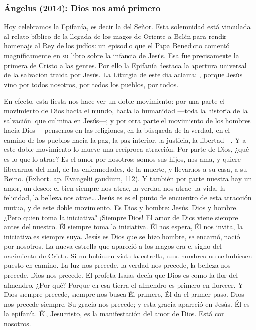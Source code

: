 			
			\subsubsection{Ángelus (2014): Dios nos amó primero}
			
				
				\begin{body}
					Hoy celebramos la Epifanía, es decir la  del Señor. Esta solemnidad está vinculada al relato bíblico de la llegada de los magos de Oriente a Belén para rendir homenaje al Rey de los judíos: un episodio que el Papa Benedicto comentó magníficamente en su libro sobre la infancia de Jesús. Esa fue precisamente la primera  de Cristo a las gentes. Por ello la Epifanía destaca la apertura universal de la salvación traída por Jesús. La Liturgia de este día aclama: , porque Jesús vino por todos nosotros, por todos los pueblos, por todos.
					
					En efecto, esta fiesta nos hace ver un doble movimiento: por una parte el movimiento de Dios hacia el mundo, hacia la humanidad ---toda la historia de la salvación, que culmina en Jesús---; y por otra parte el movimiento de los hombres hacia Dios ---pensemos en las religiones, en la búsqueda de la verdad, en el camino de los pueblos hacia la paz, la paz interior, la justicia, la libertad---. Y a este doble movimiento lo mueve una recíproca atracción. Por parte de Dios, ¿qué es lo que lo atrae? Es el amor por nosotros: somos sus hijos, nos ama, y quiere liberarnos del mal, de las enfermedades, de la muerte, y llevarnos a su casa, a su Reino.  (Exhort. ap. Evangelii gaudium, 112). Y también por parte nuestra hay un amor, un deseo: el bien siempre nos atrae, la verdad nos atrae, la vida, la felicidad, la belleza nos atrae\ldots{} Jesús es es el punto de encuentro de esta atracción mutua, y de este doble movimiento. Es Dios y hombre: Jesús. Dios y hombre. ¿Pero quien toma la iniciativa? ¡Siempre Dios! El amor de Dios viene siempre antes del nuestro. Él siempre toma la iniciativa. Él nos espera, Él nos invita, la iniciativa es siempre suya. Jesús es Dios que se hizo hombre, se encarnó, nació por nosotros. La nueva estrella que apareció a los magos era el signo del nacimiento de Cristo. Si no hubiesen visto la estrella, esos hombres no se hubiesen puesto en camino. La luz nos precede, la verdad nos precede, la belleza nos precede. Dios nos precede. El profeta Isaías decía que Dios es como la flor del almendro. ¿Por qué? Porque en esa tierra el almendro es primero en florecer. Y Dios siempre precede, siempre nos busca Él primero, Él da el primer paso. Dios nos precede siempre. Su gracia nos precede; y esta gracia apareció en Jesús. Él es la epifanía. Él, Jesucristo, es la manifestación del amor de Dios. Está con nosotros.
					

\end{body}
